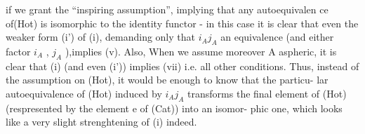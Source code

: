 
if we grant the ``inspiring assumption'', implying that any autoequivalen
ce of(Hot)  is isomorphic to the identity functor  -  in this case it is
clear that even the weaker form (i')  of (i),  demanding only that
$i_Aj_A$   an equivalence  (and   either factor $i_A$ , $j_A$ ),implies (v).
Also,  When we assume moreover A aspheric, it is clear that (i)
(and even (i')) implies (vii) i.e. all other conditions.  Thus,  instead 
of the assumption  on (Hot),  it would be enough to know that the particu-%
lar autoequivalence  of (Hot) induced by $i_Aj_A$  transforms the final
element of (Hot)  (respresented by the element e of (Cat)) into an isomor-%
phic one, which looks like a very slight strenghtening of (i) indeed.

